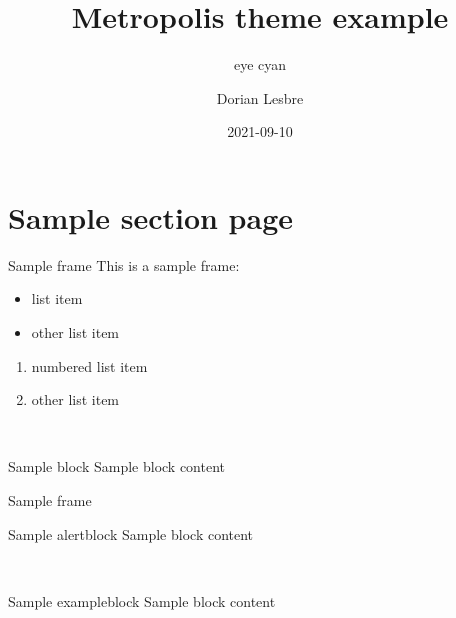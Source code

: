 \documentclass[14pt]{beamer}
\title{Metropolis theme example}
\subtitle{eye cyan}
\author{Dorian Lesbre}
\date{2021-09-10}
\begin{document}
\begin{frame}
	\titlepage
\end{frame}

\section{Sample section page}

\begin{frame}{Sample frame}
	This is a sample frame:
	\begin{multicols}{2}
		\begin{itemize}
			\item list item
			\item other list item
		\end{itemize}
		\begin{enumerate}
			\item numbered list item
			\item other list item
		\end{enumerate}
	\end{multicols}
	~\\
	\begin{block}{Sample block}
		Sample block content
	\end{block}
\end{frame}

\begin{frame}{Sample frame}

	\begin{alertblock}{Sample alertblock}
		Sample block content
	\end{alertblock}
	~\\
	\begin{exampleblock}{Sample exampleblock}
		Sample block content
	\end{exampleblock}
\end{frame}
\end{document}
